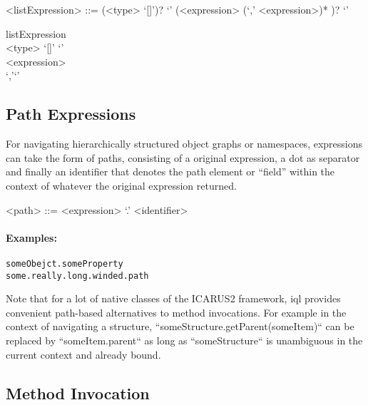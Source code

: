\documentclass[11pt,a4paper]{report}
\begin{document}
\begin{gram}
	\label{gram:list-expression}
	\begin{grammar}	
		<listExpression> ::= (<type> `[]')? `{' (<expression> (`,' <expression>)* )? `}'	
	\end{grammar}
	\diagsep
	\begin{rrdiag*}{listExpression}
		\sst \\ <type> `[]' \est `{' \sst \\ \srp <expression> \\ `,'\erp  \est `}' \\	
	\end{rrdiag*}
\end{gram}

\subsection{Path Expressions}
\label{sec:path-expressions}

For navigating hierarchically structured object graphs or namespaces, expressions can take the form of paths, consisting of a original expression, a dot as separator and finally an identifier that denotes the path element or ``field'' within the context of whatever the original expression returned.

\begin{gram}
	\label{gram:path-expression}
	\begin{grammar}	
		<path> ::= <expression> `.' <identifier> 	
	\end{grammar}
\end{gram}

\paragraph{Examples:}

\begin{Verbatim}[samepage=true]
someObejct.someProperty
some.really.long.winded.path
\end{Verbatim}

\noindent Note that for a lot of native classes of the ICARUS2 framework, \ac{iql} provides convenient path-based alternatives to method invocations. For example in  the context of navigating a structure, ``someStructure.getParent(someItem)`` can be replaced by ``someItem.parent`` as long as ``someStructure`` is unambiguous in the current context and already bound.

\subsection{Method Invocation}
\label{sec:method-invocations}
\end{document}
